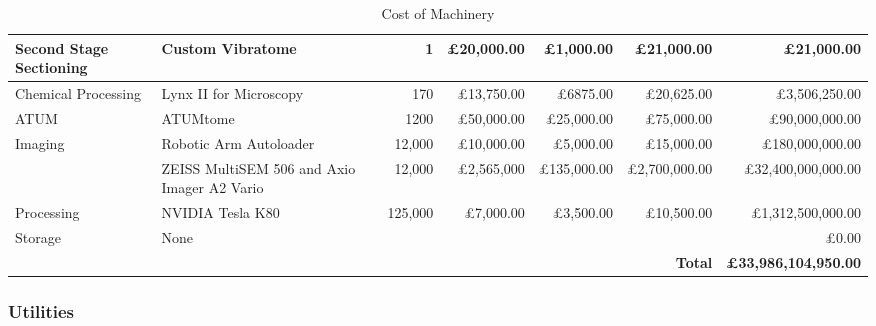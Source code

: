 \documentclass[a4paper, 11pt]{article}
\numberwithin{equation}{section}
\begin{document}
\begin{table}[H]
{\begin{tabular}{ | l | l | l | l | l | l | l | }
Second Stage Sectioning 	&	Custom Vibratome	&	\multicolumn{1}{r|}{	1	}	&	\multicolumn{1}{r|}{	\pounds	20,000.00		}				&	\multicolumn{1}{r|}{	\pounds	1,000.00	}	&	\multicolumn{1}{r|}{	\pounds	21,000.00	}	&	\multicolumn{1}{r|}{	\pounds	21,000.00	}	\\	\hline
Chemical Processing	&	Lynx II for Microscopy	&	\multicolumn{1}{r|}{	170	}	&	\multicolumn{1}{r|}{	\pounds	13,750.00		}				&	\multicolumn{1}{r|}{	\pounds	6875.00	}	&	\multicolumn{1}{r|}{	\pounds	20,625.00	}	&	\multicolumn{1}{r|}{	\pounds	3,506,250.00	}	\\	\hline
ATUM	&	ATUMtome	&	\multicolumn{1}{r|}{	1200	}	&	\multicolumn{1}{r|}{	\pounds	50,000.00		}				&	\multicolumn{1}{r|}{	\pounds	25,000.00	}	&	\multicolumn{1}{r|}{	\pounds	75,000.00	}	&	\multicolumn{1}{r|}{	\pounds	90,000,000.00	}	\\	\hline
Imaging	&	Robotic Arm Autoloader 	&	\multicolumn{1}{r|}{	12,000	}	&	\multicolumn{1}{r|}{	\pounds	10,000.00		}				&	\multicolumn{1}{r|}{	\pounds	5,000.00	}	&	\multicolumn{1}{r|}{	\pounds	15,000.00	}	&	\multicolumn{1}{r|}{	\pounds	180,000,000.00	}	\\	\hline
	&	ZEISS MultiSEM 506 and Axio Imager A2 Vario	&	\multicolumn{1}{r|}{	12,000	}	&	\multicolumn{1}{r|}{	\pounds	2,565,000		}				&	\multicolumn{1}{r|}{	\pounds	135,000.00	}	&	\multicolumn{1}{r|}{	\pounds	2,700,000.00	}	&	\multicolumn{1}{r|}{	\pounds	32,400,000,000.00	}	\\	\hline
Processing	&	NVIDIA Tesla K80	&	\multicolumn{1}{r|}{	125,000	}	&	\multicolumn{1}{r|}{	\pounds	7,000.00		}				&	\multicolumn{1}{r|}{	\pounds	3,500.00	}	&	\multicolumn{1}{r|}{	\pounds	10,500.00	}	&	\multicolumn{1}{r|}{	\pounds	1,312,500,000.00	}	\\	\hline
Storage 	&	None	&	\multicolumn{1}{r|}{		}	&	\multicolumn{1}{r|}{				}				&	\multicolumn{1}{r|}{			}	&	\multicolumn{1}{r|}{			}	&	\multicolumn{1}{r|}{\pounds 0.00			}	\\	\hline

 	&		&	\multicolumn{1}{r|}{		}	&	\multicolumn{1}{r|}{				}				&	\multicolumn{1}{r|}{			}	&	\multicolumn{1}{r|}{		\textbf{Total}	}	&	\multicolumn{1}{r|}{	\textbf{\pounds 33,986,104,950.00}		}	\\	\hline

\end{tabular}
}
\captionsetup{justification=centering}
\caption{Cost of Machinery}
\label{table:machinecost}
\end{table}

\subsubsection{Utilities}
\end{document}
